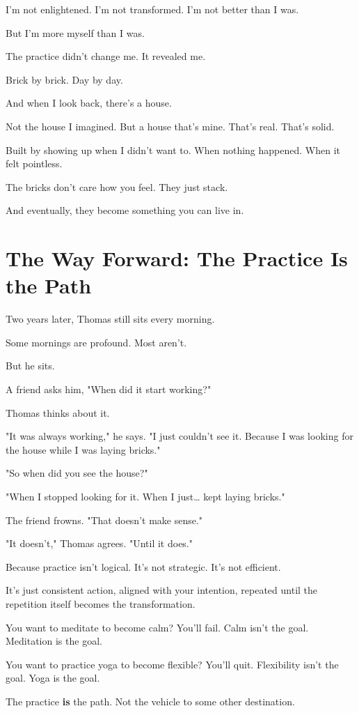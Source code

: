 \documentclass[11pt,twoside]{book}
\begin{document}
I'm not enlightened. I'm not transformed. I'm not better than I was.

But I'm more myself than I was.

The practice didn't change me. It revealed me.

Brick by brick. Day by day.

And when I look back, there's a house.

Not the house I imagined. But a house that's mine. That's real. That's solid.

Built by showing up when I didn't want to. When nothing happened. When it felt pointless.

The bricks don't care how you feel. They just stack.

And eventually, they become something you can live in.

\section*{The Way Forward: The Practice Is the Path}

Two years later, Thomas still sits every morning.

Some mornings are profound. Most aren't.

But he sits.

A friend asks him, "When did it start working?"

Thomas thinks about it.

"It was always working," he says. "I just couldn't see it. Because I was looking for the house while I was laying bricks."

"So when did you see the house?"

"When I stopped looking for it. When I just\ldots{} kept laying bricks."

The friend frowns. "That doesn't make sense."

"It doesn't," Thomas agrees. "Until it does."

Because practice isn't logical. It's not strategic. It's not efficient.

It's just consistent action, aligned with your intention, repeated until the repetition itself becomes the transformation.

You want to meditate to become calm? You'll fail. Calm isn't the goal. Meditation is the goal.

You want to practice yoga to become flexible? You'll quit. Flexibility isn't the goal. Yoga is the goal.

The practice \textbf{is} the path. Not the vehicle to some other destination.
\end{document}
